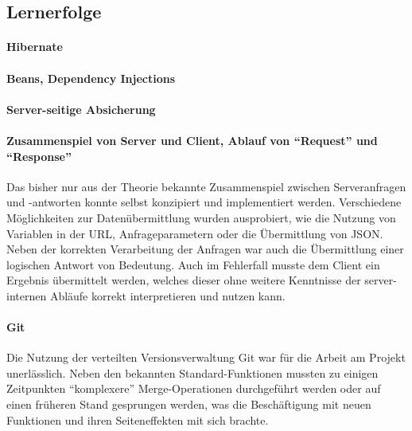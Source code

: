 	\subsection{Lernerfolge}
		\paragraph{Hibernate}
		
		\paragraph{Beans, Dependency Injections}
		
		\paragraph{Server-seitige Absicherung}
		
		\paragraph{Zusammenspiel von Server und Client, Ablauf von "`Request"' und "`Response"'}
		Das bisher nur aus der Theorie bekannte Zusammenspiel zwischen Serveranfragen und -antworten konnte selbst konzipiert und implementiert werden. Verschiedene Möglichkeiten zur Datenübermittlung wurden ausprobiert, wie die Nutzung von Variablen in der URL, Anfrageparametern oder die Übermittlung von JSON. Neben der korrekten Verarbeitung der Anfragen war auch die Übermittlung einer logischen Antwort von Bedeutung. Auch im Fehlerfall musste dem Client ein Ergebnis übermittelt werden, welches dieser ohne weitere Kenntnisse der server-internen Abläufe korrekt interpretieren und nutzen kann.
		
		\paragraph{Git}
		Die Nutzung der verteilten Versionsverwaltung Git war für die Arbeit am Projekt unerlässlich. Neben den bekannten Standard-Funktionen mussten zu einigen Zeitpunkten "`komplexere"' Merge-Operationen durchgeführt werden oder auf einen früheren Stand gesprungen werden, was die Beschäftigung mit neuen Funktionen und ihren Seiteneffekten mit sich brachte.